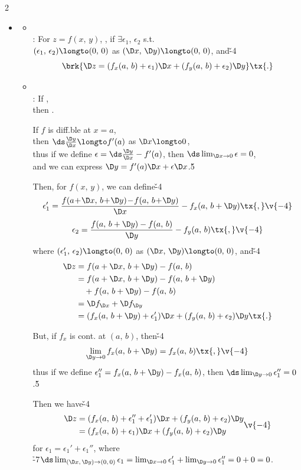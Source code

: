\documentclass[dvipdfmx,a4paper,titlepage,9pt]{jsarticle}
\begin{document}
\begin{multicols*}{2}
\begin{itemize}[label={-}]
\item{}
\begin{itemize}[label=\Cdot]
\setlength{\leftskip}{-10pt}
\item{}\\
: For $z=f(x,\,y)$, , if $\exists\epsilon_1$, $\epsilon_2$ s.t.\\
\;\;$(\epsilon_1,\,\epsilon_2)\longto(0,\,0)$ as $(\D x,\,\D y)\longto(0,\,0)$, and\v{-4}
$$\brk{\D z=(f_x(a,\,b)+\epsilon_1)\D x+(f_y(a,\,b)+\epsilon_2)\D y}\tx{.}$$

\vfill\null\columnbreak

\item{}\\
: If ,\\
\;\;then .

\begin{Pfbox}
If $f$ is diff.ble at $x=a$, \\
then $\ds\frac{\D y}{\D x}\longto f'(a)$ as $\D x\longto 0$,\\
thus if we define $\epsilon=\ds\frac{\D y}{\D x}-f'(a)$, then $\ds\lim_{\D x\to0}\epsilon=0$,\\
and we can express $\D y=f'(a)\D x+\epsilon\D x$.\v5

Then, for $f(x,\,y)$, we can define\v{-4}
$$\epsilon_1'=\frac{f(a\!+\!\D x,\,b\!+\!\D y)\!-\!f(a,\,b\!+\!\D y)}{\D x}-f_x(a,\,b+\D y)\tx{,}\v{-4}$$
$$\epsilon_2=\frac{f(a,\,b+\D y)-f(a,\,b)}{\D y}-f_y(a,\,b)\tx{,}\v{-4}$$
where $(\epsilon_1',\,\epsilon_2)\longto(0,\,0)$ as $(\D x,\,\D y)\longto(0,\,0)$, and\v{-4}
$$\begin{aligned}
\D z&=f(a+\D x,\,b+\D y)-f(a,\,b)\\
&=f(a+\D x,\,b+\D y)-f(a,\,b+\D y)\\
&\quad+f(a,\,b+\D y)-f(a,\,b)\\
&=\D f_{\D x}+\D f_{\D y} \\
&=(f_x(a,\,b+\D y)+\epsilon_1')\D x+(f_y(a,\,b)+\epsilon_2)\D y\tx{.}
\end{aligned}$$

But, if $f_x$ is cont. at $(a,\,b)$, then\v{-4}
$$\lim_{\D y\to 0}f_x(a,\,b+\D y)=f_x(a,\,b)\tx{,}\v{-4}$$
thus if we define $\epsilon_1''=f_x(a,\,b+\D y)-f_x(a,\,b)$, then $\ds\lim_{\D y\to0}\epsilon_1''=0$.\v5

Then we have\v{-4}
$$\begin{aligned}
\D z&=(f_x(a,\,b)+\epsilon_1''+\epsilon_1')\D x+(f_y(a,\,b)+\epsilon_2)\D y \\
&=(f_x(a,\,b)+\epsilon_1)\D x+(f_y(a,\,b)+\epsilon_2)\D y
\end{aligned}\v{-4}$$
for $\epsilon_1=\epsilon_1'+\epsilon_1''$, where\\
\h{-7}$\ds\lim_{(\D x,\,\D y)\to(0,\,0)}\epsilon_1=\lim_{\D x\to0}\epsilon_1'+\lim_{\D y\to0}\epsilon_1''=0+0=0$.\\
\end{Pfbox}
\end{itemize}


\end{itemize}
\end{multicols*}
\end{document}
